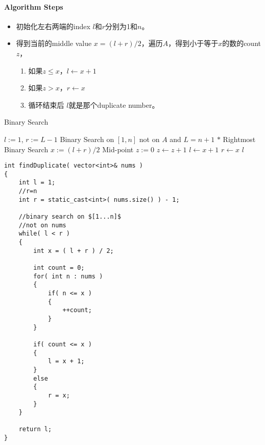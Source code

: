 \paragraph{Algorithm Steps}
\begin{itemize}
\item 初始化左右两端的index $l$和$r$分别为1和$n$。
\item 得到当前的middle value $x=(l+r)/2$，遍历$A$，得到小于等于$x$的数的count $z$，
\begin{enumerate}
\item 如果$z\leq x$，$l\gets x+1$
\item 如果$z > x$，$r\gets x$
\item 循环结束后 $l$就是那个duplicate number。
\end{enumerate}
\end{itemize}
\begin{algorithm}[H]
\caption{Binary Search}
\begin{algorithmic}[1]
\State $l:=1$, $r:=L-1$ \Comment Binary Search on $[1,n]$ not on $A$ and $L=n+1$
\State $\ast$ Rightmost Binary Search
\State $x:=(l+r)/2$ \Comment Mid-point
\State $z:=0$
\State $z\gets z+1$
\EndIf
\EndFor
{}
\State $l\gets x+1$
\Else
\State $r\gets x$
\EndIf
\EndWhile
\State \Return $l$
\EndProcedure
\end{algorithmic}
\end{algorithm}
\begin{lstlisting}[style=customc, caption={Binary Search}]
int findDuplicate( vector<int>& nums )
{
    int l = 1;
    //r=n
    int r = static_cast<int>( nums.size() ) - 1;

    //binary search on $[1...n]$
    //not on nums
    while( l < r )
    {
        int x = ( l + r ) / 2;

        int count = 0;
        for( int n : nums )
        {
            if( n <= x )
            {
                ++count;
            }
        }

        if( count <= x )
        {
            l = x + 1;
        }
        else
        {
            r = x;
        }
    }

    return l;
}
\end{lstlisting}
